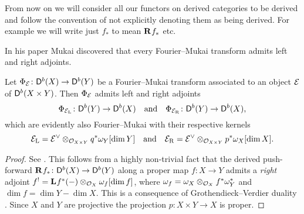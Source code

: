 \begin{remark}
    From now on we will consider all our functors on derived categories to be derived and follow the convention of not explicitly denoting them as being derived. For example we will write just $f_*$ to mean $\mathbf{R}^{}f_*$ etc.
\end{remark}

In his paper \cite{Mukai1981} Mukai discovered that every Fourier--Mukai transform admits left and right adjoints. 

\begin{proposition}
    \label{Adjoints of FM transforms}
    \emph{\cite{Mukai1981}}
    Let $\Phi_{\mathcal E} \colon \mathsf{D}^b(X) \to \mathsf{D}^b(Y)$ be a Fourier--Mukai transform associated to an object $\mathcal E$ of $\mathsf{D}^b(X \times Y)$. Then $\Phi_{\mathcal E}$ admits left and right adjoints
    \[
        \Phi_{\mathcal E_\mathrm{L}} \colon \mathsf{D}^b(Y) \to \mathsf{D}^b(X) \quad \text{and} \quad \Phi_{\mathcal E_\mathrm{R}} \colon \mathsf{D}^b(Y) \to \mathsf{D}^b(X),
    \]
    which are evidently also Fourier--Mukai with their respective kernels
    \[
        \mathcal E_\mathrm{L} = \mathcal E^\vee \otimes_{{\mathcal{O}_{X \times Y}}} q^*\omega_Y[\dim Y] \quad \text{and} \quad 
        \mathcal E_\mathrm{R} = \mathcal E^\vee \otimes_{{\mathcal{O}_{X \times Y}}} p^*\omega_X[\dim X].
    \]
\end{proposition}

\begin{proof}
    See \cite[\S 5, Proposition 5.9]{huybrechts2006fouriermukai}. This follows from a highly non-trivial fact that the derived push-forward $\mathbf{R}^{}f_* \colon \mathsf{D}^b(X) \to \mathsf{D}^b(Y)$ along a proper map $f \colon X \to Y$ admits a \emph{right} adjoint $f^! = \mathbf{L}^{}f^*(-) \otimes_{\mathcal{O}_{X}} \omega_f[\dim f]$, where $\omega_f = \omega_X \otimes_{\mathcal{O}_{X}} f^*\omega_Y^*$ and $\dim f = \dim Y - \dim X$. This is a consequence of Grothendieck--Verdier duality \cite[\S VII, Corollary 4.3]{Hartshorne1966}. Since $X$ and $Y$ are projective the projection $p \colon X \times Y \to X$ is proper.
\end{proof}

